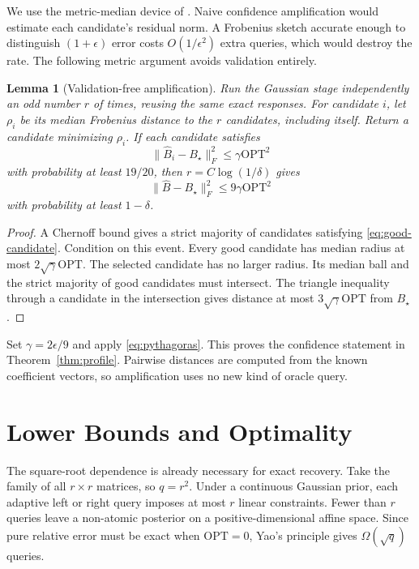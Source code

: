 \documentclass[twoside]{article}
\newtheorem{lemma}[theorem]{Lemma}
\newcommand{\OPT}{\mathrm{OPT}}
\begin{document}
We use the metric-median device of \citet{amsel2026fixed}. Naive confidence amplification would estimate each candidate's residual norm. A Frobenius sketch accurate enough to distinguish $(1+\epsilon)$ error costs $O(1/\epsilon^2)$ extra queries, which would destroy the rate. The following metric argument avoids validation entirely.

\begin{lemma}[Validation-free amplification]
\label{lem:median}
Run the Gaussian stage independently an odd number $r$ of times, reusing the same exact responses. For candidate $i$, let $\rho_i$ be its median Frobenius distance to the $r$ candidates, including itself. Return a candidate minimizing $\rho_i$. If each candidate satisfies
\begin{equation}
 \|\widehat B_i-B_\star\|_F^2\le\gamma\OPT^2
 \label{eq:good-candidate}
\end{equation}
with probability at least $19/20$, then $r=C\log(1/\delta)$ gives \[ \|\widehat B-B_\star\|_F^2\le9\gamma\OPT^2 \] with probability at least $1-\delta$.
\end{lemma}

\begin{proof}
A Chernoff bound gives a strict majority of candidates satisfying \eqref{eq:good-candidate}. Condition on this event. Every good candidate has median radius at most $2\sqrt\gamma\OPT$. The selected candidate has no larger radius. Its median ball and the strict majority of good candidates must intersect. The triangle inequality through a candidate in the intersection gives distance at most $3\sqrt\gamma\OPT$ from $B_\star$.
\end{proof}

Set $\gamma=2\epsilon/9$ and apply \eqref{eq:pythagoras}. This proves the confidence statement in Theorem~\ref{thm:profile}. Pairwise distances are computed from the known coefficient vectors, so amplification uses no new kind of oracle query.

\section{Lower Bounds and Optimality}
\label{sec:lower}

The square-root dependence is already necessary for exact recovery. Take the family of all $r\times r$ matrices, so $q=r^2$. Under a continuous Gaussian prior, each adaptive left or right query imposes at most $r$ linear constraints. Fewer than $r$ queries leave a non-atomic posterior on a positive-dimensional affine space. Since pure relative error must be exact when $\OPT=0$, Yao's principle gives $\Omega(\sqrt q)$ queries.
\end{document}
